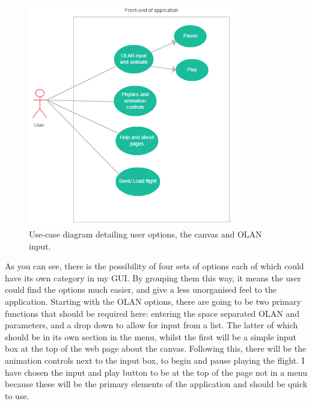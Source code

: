 \begin{figure}[h!]
  \centering
      \includegraphics[width=0.8\textwidth]{images/usecase.png}
  \caption{Use-case diagram detailing user options, the canvas and OLAN input.}
  \label{fig:usecase}
\end{figure}

As you can see, there is the possibility of four sets of options each of which could have its own category in my GUI. By grouping them this way, it means the user could find the options much easier, and give a less unorganised feel to the application. Starting with the OLAN options, there are going to be two primary functions that should be required here: entering the space separated OLAN and parameters, and a drop down to allow for input from a list. The latter of which should be in its own section in the menu, whilst the first will be a simple input box at the top of the web page about the canvas. Following this, there will be the animation controls next to the input box, to begin and pause playing the flight. I have chosen the input and play button to be at the top of the page not in a menu because these will be the primary elements of the application and should be quick to use.

